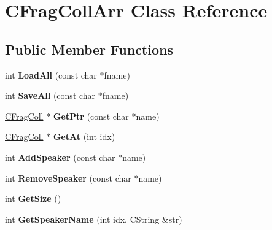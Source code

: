 \hypertarget{class_c_frag_coll_arr}{\section{C\-Frag\-Coll\-Arr Class Reference}
\label{class_c_frag_coll_arr}
}
\subsection*{Public Member Functions}
\begin{DoxyCompactItemize}
\item 
\hypertarget{class_c_frag_coll_arr_a50a3854ee1dffe841439161f1b7667c9}{int {\bfseries Load\-All} (const char $\ast$fname)}\label{class_c_frag_coll_arr_a50a3854ee1dffe841439161f1b7667c9}

\item 
\hypertarget{class_c_frag_coll_arr_a7b687649e58dc300e58e504c4e5ee5b5}{int {\bfseries Save\-All} (const char $\ast$fname)}\label{class_c_frag_coll_arr_a7b687649e58dc300e58e504c4e5ee5b5}

\item 
\hypertarget{class_c_frag_coll_arr_a445ff5b6f3cd306c9ea204f9464329c3}{\hyperlink{class_c_frag_coll}{C\-Frag\-Coll} $\ast$ {\bfseries Get\-Ptr} (const char $\ast$name)}\label{class_c_frag_coll_arr_a445ff5b6f3cd306c9ea204f9464329c3}

\item 
\hypertarget{class_c_frag_coll_arr_a50b7c8f570b3fae25c3961a03652685a}{\hyperlink{class_c_frag_coll}{C\-Frag\-Coll} $\ast$ {\bfseries Get\-At} (int idx)}\label{class_c_frag_coll_arr_a50b7c8f570b3fae25c3961a03652685a}

\item 
\hypertarget{class_c_frag_coll_arr_adb6ca34300ca4bc2b3374aa0c32590a0}{int {\bfseries Add\-Speaker} (const char $\ast$name)}\label{class_c_frag_coll_arr_adb6ca34300ca4bc2b3374aa0c32590a0}

\item 
\hypertarget{class_c_frag_coll_arr_ad4684c106ed7320ffa7c8f5277266f18}{int {\bfseries Remove\-Speaker} (const char $\ast$name)}\label{class_c_frag_coll_arr_ad4684c106ed7320ffa7c8f5277266f18}

\item 
\hypertarget{class_c_frag_coll_arr_a2e52e782f929804b254f155e3a481679}{int {\bfseries Get\-Size} ()}\label{class_c_frag_coll_arr_a2e52e782f929804b254f155e3a481679}

\item 
\hypertarget{class_c_frag_coll_arr_aa556d00d6944e88a9eb0032fce204244}{int {\bfseries Get\-Speaker\-Name} (int idx, C\-String \&str)}\label{class_c_frag_coll_arr_aa556d00d6944e88a9eb0032fce204244}


\end{DoxyCompactItemize}
